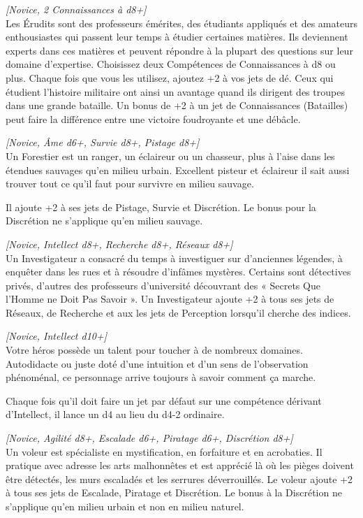 \begin{description}[align=left]
    \item [\'Erudit]
        \emph{[Novice, 2 Connaissances à d8+]}\\
        Les \'Erudits sont des professeurs émérites, des étudiants appliqués et des amateurs enthousiastes qui passent leur temps à étudier certaines matières. Ils deviennent experts dans ces matières et peuvent répondre à la plupart des questions sur leur domaine d’expertise. Choisissez deux Compétences de Connaissances à d8 ou plus. Chaque fois que vous les utilisez, ajoutez +2 à vos jets de dé. Ceux qui étudient l’histoire militaire ont ainsi un avantage quand ils dirigent des troupes dans une grande bataille. Un bonus de +2 à un jet de Connaissances (Batailles) peut faire la différence entre une victoire foudroyante et une débâcle.

    \item [Forestier]
        \emph{[Novice, Âme d6+, Survie d8+, Pistage d8+]}\\
        Un Forestier est un ranger, un éclaireur ou un chasseur, plus à l’aise dans les étendues sauvages qu’en milieu urbain. Excellent pisteur et éclaireur il sait aussi trouver tout ce qu’il faut pour survivre en milieu sauvage. 

        Il ajoute +2 à ses jets de Pistage, Survie et Discrétion. Le bonus pour la Discrétion ne s’applique qu’en milieu sauvage.

    \item [Investigateur]
        \emph{[Novice, Intellect d8+, Recherche d8+, Réseaux d8+]}\\
        Un Investigateur a consacré du temps à investiguer sur d’anciennes légendes, à enquêter dans les rues et à résoudre d’infâmes mystères. Certains sont détectives privés, d’autres des professeurs d’université découvrant des « Secrets Que l’Homme ne Doit Pas Savoir ». Un Investigateur ajoute +2 à tous ses jets de Réseaux, de Recherche et aux les jets de Perception lorsqu’il cherche des indices.

    \item [Touche-à-Tout]
        \emph{[Novice, Intellect d10+]}\\
        Votre héros possède un talent pour toucher à de nombreux domaines. Autodidacte ou juste doté d’une intuition et d’un sens de l’observation phénoménal, ce personnage arrive toujours à savoir comment ça marche.

        Chaque fois qu’il doit faire un jet par défaut sur une compétence dérivant d’Intellect, il lance un d4 au lieu du d4-2 ordinaire.

    \item [Voleur]
        \emph{[Novice, Agilité d8+, Escalade d6+, Piratage d6+, Discrétion d8+]}\\
        Un voleur est spécialiste en mystification, en forfaiture et en acrobaties. Il pratique avec adresse les arts malhonnêtes et est apprécié là où les pièges doivent être détectés, les murs escaladés et les serrures déverrouillés. Le voleur ajoute +2 à tous ses jets de Escalade, Piratage et Discrétion. Le bonus à la Discrétion ne s’applique qu’en milieu urbain et non en milieu naturel.
\end{description}

